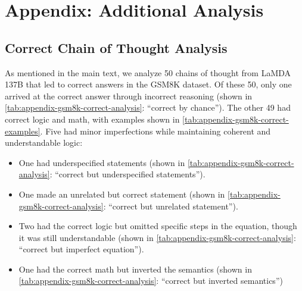 \documentclass[]{article}
\theoremstyle{plain}
\theoremstyle{definition}
\theoremstyle{remark}
\newcommand{\lamda}[0]{LaMDA}
\begin{document}
\section{Appendix: Additional Analysis}

\subsection{Correct Chain of Thought Analysis}\label{subsec:correct-chain-of-thought}
As mentioned in the main text, we analyze 50 chains of thought from \lamda{} 137B that led to correct answers in the GSM8K dataset.
Of these 50, only one arrived at the correct answer through incorrect reasoning (shown in \cref{tab:appendix-gsm8k-correct-analysis}: ``correct by chance'').
The other 49 had correct logic and math, with examples shown in \cref{tab:appendix-gsm8k-correct-examples}.
Five had minor imperfections while maintaining coherent and understandable logic:
\begin{itemize}[leftmargin=*,topsep=0pt]
    \itemsep0em 
    \item One had underspecified statements (shown in \cref{tab:appendix-gsm8k-correct-analysis}: ``correct but underspecified statements''). 
    \item One made an unrelated but correct statement (shown in \cref{tab:appendix-gsm8k-correct-analysis}: ``correct but unrelated statement'').
    \item Two had the correct logic but omitted specific steps in the equation, though it was still understandable (shown in \cref{tab:appendix-gsm8k-correct-analysis}: ``correct but imperfect equation'').
    \item One had the correct math but inverted the semantics (shown in \cref{tab:appendix-gsm8k-correct-analysis}: ``correct but inverted semantics'')
\end{itemize}
\end{document}
